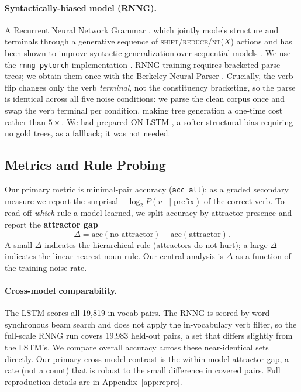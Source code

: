 \paragraph{Syntactically-biased model (RNNG).} A Recurrent Neural Network
Grammar \citep{dyer2016rnng}, which jointly models structure and terminals
through a generative sequence of \textsc{shift}/\textsc{reduce}/\textsc{nt}($X$)
actions and has been shown to improve syntactic generalization over sequential
models \citep{wilcox2020}. We use the \texttt{rnng-pytorch} implementation
\citep{noji2021}. RNNG training requires bracketed parse trees; we obtain them
once with the Berkeley Neural Parser \citep{kitaev2018}. Crucially, the verb
flip changes only the verb \emph{terminal}, not the constituency bracketing, so
the parse is identical across all five noise conditions: we parse the clean
corpus once and swap the verb terminal per condition, making tree generation a
one-time cost rather than $5\times$. We had prepared ON-LSTM \citep{shen2019}, a
softer structural bias requiring no gold trees, as a fallback; it was not needed.

\subsection{Metrics and Rule Probing}
\label{sec:metrics}
Our primary metric is minimal-pair accuracy (\texttt{acc\_all}); as a graded
secondary measure we report the surprisal $-\log_2 P(v^{+}\mid\text{prefix})$ of
the correct verb. To read off \emph{which} rule a model learned, we split
accuracy by attractor presence and report the \textbf{attractor gap}
\[
  \Delta = \mathrm{acc}(\text{no-attractor}) - \mathrm{acc}(\text{attractor}).
\]
A small $\Delta$ indicates the hierarchical rule (attractors do not hurt); a
large $\Delta$ indicates the linear nearest-noun rule. Our central analysis is
$\Delta$ as a function of the training-noise rate.

\paragraph{Cross-model comparability.} The LSTM scores all 19{,}819 in-vocab
pairs. The RNNG is scored by word-synchronous beam search and does not apply the
in-vocabulary verb filter, so the full-scale RNNG run covers 19{,}983 held-out
pairs, a set that differs slightly from the LSTM's. We compare overall accuracy
across these near-identical sets directly. Our primary cross-model contrast is
the within-model attractor gap, a rate (not a count) that is robust to the small
difference in covered pairs. Full reproduction details are in
Appendix~\ref{app:repro}.
